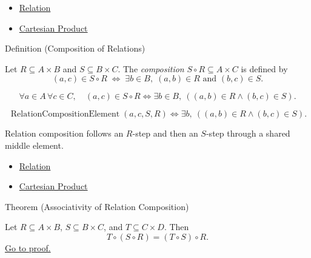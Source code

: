 \begin{dependencies}
\begin{itemize}
  \item \hyperref[def:relation]{Relation}
  \item \hyperref[def:cartesian-product-rel]{Cartesian Product}
\end{itemize}
\end{dependencies}

\begin{definitionbox}{Definition (Composition of Relations)}
\begin{definition}\label{def:relation-composition}
Let $R\subseteq A\times B$ and $S\subseteq B\times C$. The
\emph{composition} $S\circ R\subseteq A\times C$ is defined by
\[
(a,c)\in S\circ R
\;\Longleftrightarrow\;
\exists b\in B,\; (a,b)\in R \text{ and } (b,c)\in S.
\]
\end{definition}
\end{definitionbox}

\begin{remark*}
\[
  \forall a\in A\,\forall c\in C,\quad
  (a,c)\in S\circ R
  \iff
  \exists b\in B,\ ((a,b)\in R\wedge(b,c)\in S).
\]
\end{remark*}

\begin{remark*}
\[
  \operatorname{RelationCompositionElement}(a,c,S,R)
  \iff
  \exists b,\ ((a,b)\in R\wedge(b,c)\in S).
\]
\end{remark*}

\begin{remark*}[Interpretation]
Relation composition follows an $R$-step and then an $S$-step through a shared
middle element.
\end{remark*}

\begin{dependencies}
\begin{itemize}
  \item \hyperref[def:relation]{Relation}
  \item \hyperref[def:cartesian-product-rel]{Cartesian Product}
\end{itemize}
\end{dependencies}

\begin{theorembox}{Theorem (Associativity of Relation Composition)}
\begin{theorem}\label{thm:relation-composition-assoc}
Let $R\subseteq A\times B$, $S\subseteq B\times C$, and
$T\subseteq C\times D$. Then
\[
T\circ(S\circ R)=(T\circ S)\circ R.
\]
\hyperref[prf:relation-composition-assoc]{Go to proof.}
\end{theorem}
\end{theorembox}

